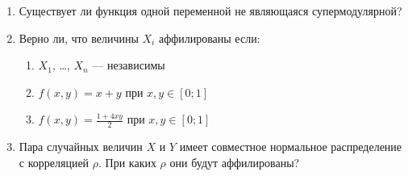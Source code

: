 \begin{enumerate}
\item Существует ли функция одной переменной не являющаяся супермодулярной?

\item Верно ли, что величины $ X_{i} $ аффилированы если:

\begin{enumerate}
\item $ X_{1} $, \ldots, $ X_{n} $ — независимы
\item $ f(x,y)=x+y $ при $ x,y\in [0;1] $
\item $ f(x,y)=\frac{1+4xy}{2} $ при $ x,y\in [0;1] $
\end{enumerate}

\item Пара случайных величин $ X $ и $ Y $ имеет совместное нормальное распределение с корреляцией $ \rho $. При каких $ \rho $ они будут аффилированы?

\end{enumerate}


